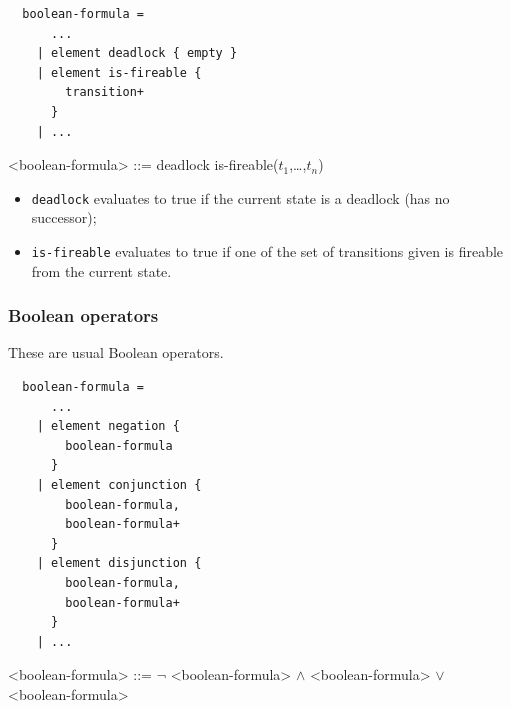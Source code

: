 \documentclass[10pt,english,a4paper]{article}
\begin{document}
\begin{multicols}{2}
\begin{lstlisting}
  boolean-formula =
      ...
    | element deadlock { empty }
    | element is-fireable {
        transition+
      }
    | ...
\end{lstlisting}
\columnbreak
\begin{grammar}
<boolean-formula> ::= deadlock
\alt is-fireable($t_1$,\dots,$t_n$)
\end{grammar}
\end{multicols}


\begin{itemize}
  \item \lstinline!deadlock! evaluates to true if the current state is a deadlock
    (has no successor);
  \item \lstinline!is-fireable! evaluates to true if one of the set of transitions given
    is fireable from the current state.
\end{itemize}

\subsubsection{Boolean operators}

These are usual Boolean operators.


\begin{multicols}{2}
\begin{lstlisting}
  boolean-formula =
      ...
    | element negation {
        boolean-formula
      }
    | element conjunction {
        boolean-formula,
        boolean-formula+
      }
    | element disjunction {
        boolean-formula,
        boolean-formula+
      }
    | ...
\end{lstlisting}
\columnbreak
\begin{grammar}
<boolean-formula> ::= $\lnot$ <boolean-formula>
 $\wedge$ <boolean-formula>
 $\vee$ <boolean-formula>
\end{grammar}
\end{multicols}
\end{document}

